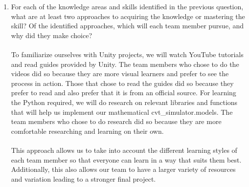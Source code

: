 \documentclass[12pt]{article}
\begin{document}
\begin{enumerate}
  For Python, we need to learn how to create and implement these complex mathematical models and learn how to make these Python models interface with Unity.
  It is important that each team member acquires a general knowledge of these skills as team members completing the Python code must be familiar with interfacing the code with Unity. 
  As well as team members completing the models within Unity must understand the mathematical Python models to use Unity to simulate them. 
  \item For each of the knowledge areas and skills identified in the previous
  question, what are at least two approaches to acquiring the knowledge or
  mastering the skill?  Of the identified approaches, which will each team
  member pursue, and why did they make  choice?
  \\\\
  To familiarize ourselves with Unity projects, we will watch YouTube tutorials and read guides provided by Unity.
  The team members who chose to do the videos did so because they are more visual learners and prefer to see the process in action.
  Those that chose to read the guides did so because they prefer to read and also prefer that it is from an official source.
  For learning the Python required, we will do research on relevant libraries and functions that will help us implement our mathematical cvt_simulator.models.
  The team members who chose to do research did so because they are more comfortable researching and learning on their own.
  \\\\
  This approach allows us to take into account the different learning styles of each team member so that everyone can learn in a way that suits them best. 
  Additionally, this also allows our team to have a larger variety of resources and variation leading to a stronger final project.

\end{enumerate}
\end{document}
